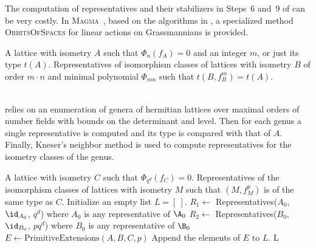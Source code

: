\begin{remark}
  The computation of representatives and their stabilizers in Steps~6 and~9 of  can be very costly.
  In \textsc{Magma}~\cite{magma}, based on the algorithms in \cite{obrien1990}, a specialized method \textsc{OrbitsOfSpaces}
for linear actions on Grassmannians is provided.
\end{remark}


\begingroup
{}\label{reps}
\endgroup
 \begin{algorithmic}
  \REQUIRE A lattice with isometry $A$ such that $\Phi_n(f_A)=0$ and an integer $m$,
  or just its type $t(A)$.
  \ENSURE Representatives of isomorphism classes of lattices with isometry $B$ of order $m \cdot n$ and minimal polynomial $\Phi_{mn}$ such that $t(B,f_B^m)=t(A)$.
 \end{algorithmic}\hrulefill\\

 relies on an enumeration of genera of hermitian lattices over maximal orders of number fields with bounds on the determinant and level.
Then for each genus a single representative is computed \cite[Algorithm 3.5.6]{KirschmerHabil}
and its type is compared with that of $A$.
Finally, Kneser's neighbor method \cite[\S 5]{KirschmerHabil} is used to compute representatives for the isometry classes of the genus.
\begingroup
{}\label{split}
\endgroup
\begin{algorithmic}[1]
\REQUIRE A lattice with isometry $C$ such that $\Phi_{q^d}(f_C)=0$.
\ENSURE Representatives of the isomorphism classes of lattices with isometry $M$ such that $(M,f_M^p)$ is of the same type as $C$.
\STATE Initialize an empty list $L = [\ ]$.
 \label{splitfor1}
  \STATE $R_1\gets$ Representatives($A_0$, $\id_{A_0}$, $q^d$) where $A_0$ is any representative of $\A_0$
  \STATE $R_2\gets$ Representatives($B_0$, $\id_{B_0}$, $pq^d$) where $B_0$ is any representative of $\B_0$
   \label{split_for} \label{splitfor2}
    \STATE $E \gets \mbox{PrimitiveExtensions}(A,B,C,p)$
    \STATE Append the elements of $E$ to $L$.
    \ENDFOR
\ENDFOR
\RETURN L
\end{algorithmic}\hrulefill\\

